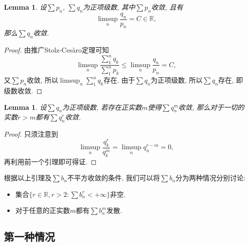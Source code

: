 \documentclass[a4paper, 12pt]{ctexart}
\newtheorem{lemma}[theorem]{Lemma}
\theoremstyle{plain}
\theoremstyle{plain}
\theoremstyle{plain}
\theoremstyle{nonumberplain}
\newtheorem{proof}{Proof}
\newcommand{\BR}{\mathbb{R}}
\begin{document}
    \begin{lemma}
        设$\sum{p_{n}}$, $\sum{q_{n}}$为正项级数, 其中$\sum{p_{n}}$收敛,
        且有
        \begin{equation}
            \label{equation_limsup}
            \limsup_{n}{\frac{q_{n}}{p_{n}}} = C \in \BR,
        \end{equation}
        那么$\sum{q_{n}}$收敛.
    \end{lemma}

    \begin{proof}
        由推广Stolz-Ces\`aro定理可知
        \begin{equation}
            \limsup_{n}{\frac{\sum_{1}^{n}{q_{k}}}{\sum_{1}^{n}{p_{k}}}}
            \leq
            \limsup_{n}{\frac{{q_{n}}}{{p_{n}}}}
            =
            C,
        \end{equation}
        又$\sum{p_{n}}$收敛, 所以$\limsup_{n}{\sum_{1}^{n}{q_{k}}}$存在.
        由于$\sum{q_{n}}$为正项级数, 所以$\sum{q_{n}}$存在, 即级数收敛.
    \end{proof}

    \begin{lemma}
        设$\sum{q_{n}}$为正项级数, 若存在正实数$m$使得$\sum{q_{n}^{m}}$收敛,
        那么对于一切的实数$r>m$都有$\sum{q_{n}^{r}}$收敛.
    \end{lemma}

    \begin{proof}
        只须注意到
        \begin{equation}
            \limsup_{n}{\frac{q_{k}^{r}}{q_{k}^{m}}}
            =
            \limsup_{n}{q_{n}^{r-m}}
            =
            0,
        \end{equation}
        再利用前一个引理即可得证.
    \end{proof}

    根据以上引理及$\sum{b_{n}}$不平方收敛的条件,
    我们可以将$\sum{b_{n}}$分为两种情况分别讨论:
    \begin{itemize}
        \item
    
        集合$\{r\in \BR, r > 2: \sum{b_{n}^{r}}<+\infty\}$非空.

        \item

        对于任意的正实数$m$都有$\sum{b_{n}^{m}}$发散.
    \end{itemize}

    \subsection{第一种情况}
\end{document}

